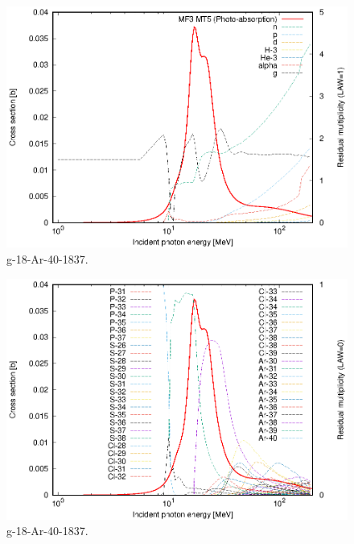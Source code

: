 \begin{figure}
 \includegraphics[width=\linewidth]{eps/g_18-Ar-40_1837.eps}
  \caption{g-18-Ar-40-1837.}
\end{figure}
\begin{figure}
 \includegraphics[width=\linewidth]{eps-law0/g_18-Ar-40_1837.eps}
 \caption{g-18-Ar-40-1837.}
\end{figure}
\newpage \clearpage

